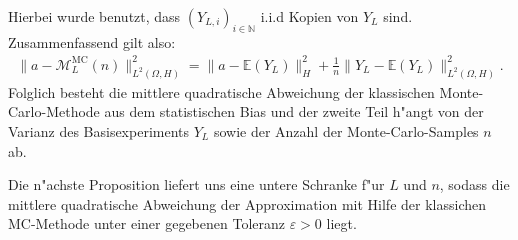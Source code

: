 Hierbei wurde benutzt, dass $(Y_{L,i})_{i\in\mathbb{N}}$ i.i.d Kopien von $Y_L$ sind.\\
Zusammenfassend gilt also:
\begin{align}\label{mc}
\|a-\mathcal{M}_L^{\text{MC}}(n)\|^2_{L^2(\Omega,H)}=\|a-\mathbb{E}(Y_L)\|_H^2+\frac{1}{n}\|Y_L-\mathbb{E}(Y_L)\|^2_{L^2(\Omega,H)}.
\end{align}
Folglich besteht die mittlere quadratische Abweichung der klassischen Monte-Carlo-Methode aus dem statistischen Bias und der zweite Teil h"angt von der Varianz des Basisexperiments $Y_L$  sowie der Anzahl der Monte-Carlo-Samples $n$ ab.\vspace{0,2cm}

Die n"achste Proposition liefert uns eine untere Schranke f"ur $L$ und $n$, sodass die mittlere quadratische Abweichung der Approximation mit Hilfe der klassichen MC-Methode unter einer gegebenen Toleranz $\varepsilon>0$ liegt.

